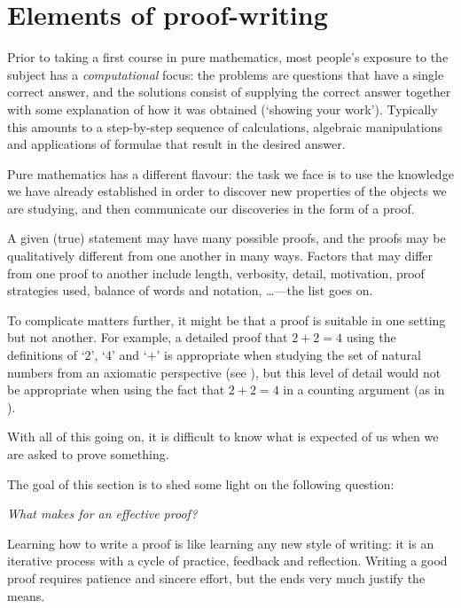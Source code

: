 \section{Elements of proof-writing}
\label{secElementsOfProofWriting}

Prior to taking a first course in pure mathematics, most people's exposure to the subject has a \textit{computational} focus: the problems are questions that have a single correct answer, and the solutions consist of supplying the correct answer together with some explanation of how it was obtained (`showing your work'). Typically this amounts to a step-by-step sequence of calculations, algebraic manipulations and applications of formulae that result in the desired answer.

Pure mathematics has a different flavour: the task we face is to use the knowledge we have already established in order to discover new properties of the objects we are studying, and then communicate our discoveries in the form of a proof.

A given (true) statement may have many possible proofs, and the proofs may be qualitatively different from one another in many ways. Factors that may differ from one proof to another include length, verbosity, detail, motivation, proof strategies used, balance of words and notation, \dots{}---the list goes on.

To complicate matters further, it might be that a proof is suitable in one setting but not another. For example, a detailed proof that $2+2=4$ using the definitions of `$2$', `$4$' and `$+$' is appropriate when studying the set of natural numbers from an axiomatic perspective (see ), but this level of detail would not be appropriate when using the fact that $2+2=4$ in a counting argument (as in ).

With all of this going on, it is difficult to know what is expected of us when we are asked to prove something.

The goal of this section is to shed some light on the following question:
\vspace{-10pt}
\begin{center}
\textit{What makes for an effective proof?}
\end{center}
\vspace{-10pt}

Learning how to write a proof is like learning any new style of writing: it is an iterative process with a cycle of practice, feedback and reflection. Writing a good proof requires patience and sincere effort, but the ends very much justify the means.

